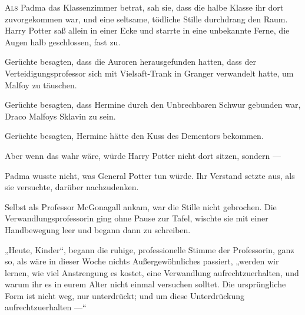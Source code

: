 
\lettrine{A}{ls} Padma das Klassenzimmer betrat, sah sie, dass die halbe Klasse ihr dort zuvorgekommen war, und eine seltsame, tödliche Stille durchdrang den Raum. Harry Potter saß allein in einer Ecke und starrte in eine unbekannte Ferne, die Augen halb geschlossen, fast zu.

Gerüchte besagten, dass die Auroren herausgefunden hatten, dass der Verteidigungsprofessor sich mit Vielsaft-Trank in Granger verwandelt hatte, um Malfoy zu täuschen.

Gerüchte besagten, dass Hermine durch den Unbrechbaren Schwur gebunden war, Draco Malfoys Sklavin zu sein.

Gerüchte besagten, Hermine hätte den Kuss des Dementors bekommen.

Aber wenn das wahr wäre, würde Harry Potter nicht dort sitzen, sondern —

Padma wusste nicht, was General Potter tun würde. Ihr Verstand setzte aus, als sie versuchte, darüber nachzudenken.

Selbst als Professor McGonagall ankam, war die Stille nicht gebrochen. Die Verwandlungsprofessorin ging ohne Pause zur Tafel, wischte sie mit einer Handbewegung leer und begann dann zu schreiben.

„Heute, Kinder“, begann die ruhige, professionelle Stimme der Professorin, ganz so, als wäre in dieser Woche nichts Außergewöhnliches passiert, „werden wir lernen, wie viel Anstrengung es kostet, eine Verwandlung aufrechtzuerhalten, und warum ihr es in eurem Alter nicht einmal versuchen solltet. Die ursprüngliche Form ist nicht weg, nur unterdrückt; und um diese Unterdrückung aufrechtzuerhalten —“

